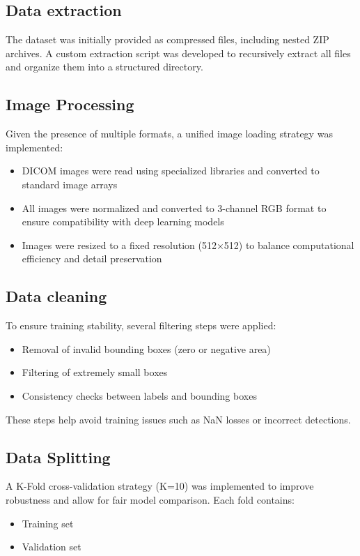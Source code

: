\documentclass[12pt,a4paper]{article} %
\begin{document}
\subsection{Data extraction}
The dataset was initially provided as compressed files, including nested ZIP archives. A custom extraction script was developed to recursively extract all files and organize them into a structured directory.

\subsection{Image Processing}
Given the presence of multiple formats, a unified image loading strategy was implemented:
\begin{itemize}
  \item DICOM images were read using specialized libraries and converted to standard image arrays
  \item All images were normalized and converted to 3-channel RGB format to ensure compatibility with deep learning models
  \item Images were resized to a fixed resolution (512×512) to balance computational efficiency and detail preservation
\end{itemize}

\subsection{Data cleaning}
To ensure training stability, several filtering steps were applied:
\begin{itemize}
  \item Removal of invalid bounding boxes (zero or negative area)
  \item Filtering of extremely small boxes
  \item Consistency checks between labels and bounding boxes
\end{itemize}

These steps help avoid training issues such as NaN losses or incorrect detections.

\subsection{Data Splitting}
A K-Fold cross-validation strategy (K=10) was implemented to improve robustness and allow for fair model comparison. Each fold contains:
\begin{itemize}
  \item Training set
  \item Validation set
\end{itemize}
\end{document}
